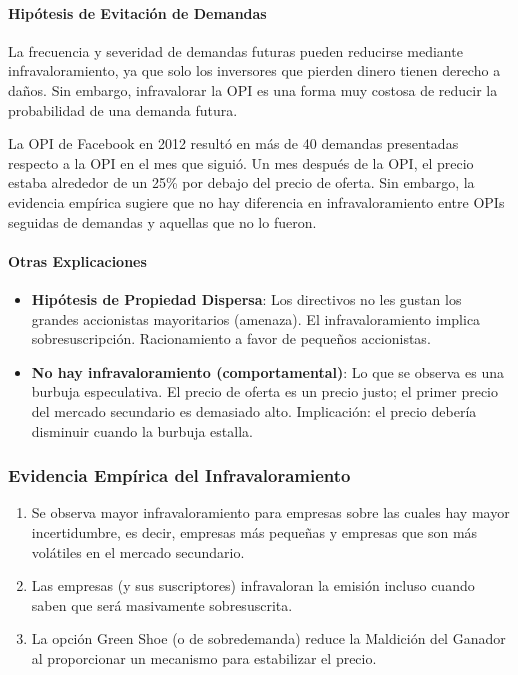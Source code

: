 \paragraph{Hipótesis de Evitación de Demandas}

La frecuencia y severidad de demandas futuras pueden reducirse mediante infravaloramiento, ya que solo los inversores que pierden dinero tienen derecho a daños. Sin embargo, infravalorar la OPI es una forma muy costosa de reducir la probabilidad de una demanda futura.

\begin{ejemplo}
La OPI de Facebook en 2012 resultó en más de 40 demandas presentadas respecto a la OPI en el mes que siguió. Un mes después de la OPI, el precio estaba alrededor de un 25\% por debajo del precio de oferta. Sin embargo, la evidencia empírica sugiere que no hay diferencia en infravaloramiento entre OPIs seguidas de demandas y aquellas que no lo fueron.
\end{ejemplo}

\paragraph{Otras Explicaciones}

\begin{itemize}
\item \textbf{Hipótesis de Propiedad Dispersa}: Los directivos no les gustan los grandes accionistas mayoritarios (amenaza). El infravaloramiento implica sobresuscripción. Racionamiento a favor de pequeños accionistas.
\item \textbf{No hay infravaloramiento (comportamental)}: Lo que se observa es una burbuja especulativa. El precio de oferta es un precio justo; el primer precio del mercado secundario es demasiado alto. Implicación: el precio debería disminuir cuando la burbuja estalla.
\end{itemize}

\subsubsection{Evidencia Empírica del Infravaloramiento}

\begin{proposicion}
\begin{enumerate}
\item Se observa mayor infravaloramiento para empresas sobre las cuales hay mayor incertidumbre, es decir, empresas más pequeñas y empresas que son más volátiles en el mercado secundario.
\item Las empresas (y sus suscriptores) infravaloran la emisión incluso cuando saben que será masivamente sobresuscrita.
\item La opción Green Shoe (o de sobredemanda) reduce la Maldición del Ganador al proporcionar un mecanismo para estabilizar el precio.
\end{enumerate}
\end{proposicion}

